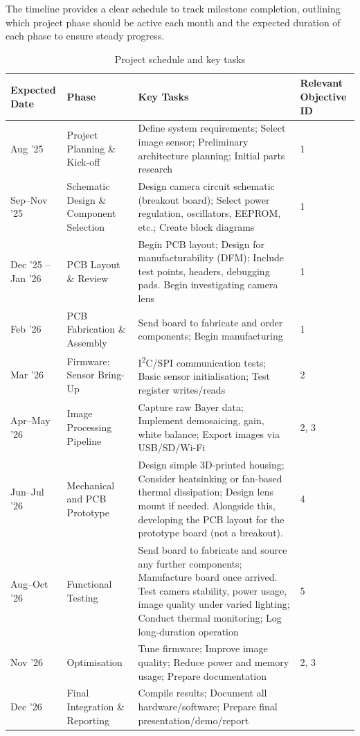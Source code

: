 The timeline provides a clear schedule to track milestone completion, outlining which project phase should be active each month and the expected duration of each phase to ensure steady progress.

\begin{table}[H]
\centering
\begin{tabular}{|p{1.5cm}|p{3cm}|p{7.5cm}|p{2cm}|}
\hline
\textbf{Expected Date} & \textbf{Phase} & \textbf{Key Tasks} & \textbf{Relevant Objective ID} \\
\hline
Aug '25 & Project Planning \& Kick-off & Define system requirements; Select image sensor; Preliminary architecture planning; Initial parts research & 1 \\
\hline
Sep--Nov '25 & Schematic Design \& Component Selection & Design camera circuit schematic (breakout board); Select power regulation, oscillators, EEPROM, etc.; Create block diagrams & 1 \\
\hline
Dec '25 -- Jan '26 & PCB Layout \& Review & Begin PCB layout; Design for manufacturability (DFM); Include test points, headers, debugging pads. Begin investigating camera lens & 1 \\
\hline
Feb '26 & PCB Fabrication \& Assembly & Send board to fabricate and order components; Begin manufacturing & 1 \\
\hline
Mar '26 & Firmware: Sensor Bring-Up & I\textsuperscript{2}C/SPI communication tests; Basic sensor initialisation; Test register writes/reads & 2 \\
\hline
Apr--May '26 & Image Processing Pipeline & Capture raw Bayer data; Implement demosaicing, gain, white balance; Export images via USB/SD/Wi-Fi & 2, 3 \\
\hline
Jun--Jul '26 & Mechanical and PCB Prototype & Design simple 3D-printed housing; Consider heatsinking or fan-based thermal dissipation; Design lens mount if needed. Alongside this, developing the PCB layout for the prototype board (not a breakout). & 4 \\
\hline
Aug--Oct '26 & Functional Testing & Send board to fabricate and source any further components; Manufacture board once arrived. Test camera stability, power usage, image quality under varied lighting; Conduct thermal monitoring; Log long-duration operation & 5 \\
\hline
Nov '26 & Optimisation & Tune firmware; Improve image quality; Reduce power and memory usage; Prepare documentation & 2, 3 \\
\hline
Dec '26 & Final Integration \& Reporting & Compile results; Document all hardware/software; Prepare final presentation/demo/report &  \\
\hline
\end{tabular}
\caption{Project schedule and key tasks}
\label{tab:project_schedule}
\end{table}